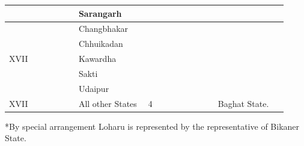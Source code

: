 \begin{longtable}{|p{0.23\linewidth}|p{0.23\linewidth}|p{0.23\linewidth}|p{0.23\linewidth}|}
 \\
\hline
 & Sarangarh

 \\
\hline
\multirow{5}{*}{XVII









} & Changbhakar

 \\
\hline
 & Chhuikadan

 \\
\hline
 & Kawardha

 \\
\hline
 & Sakti

 \\
\hline
 & Udaipur

 \\
\hline
XVII

 & All other States

 & 4

 & Baghat State.

 \\
\hline
\end{longtable}
\medskip


*By special arrangement Loharu is represented by the representative of Bikaner State.

